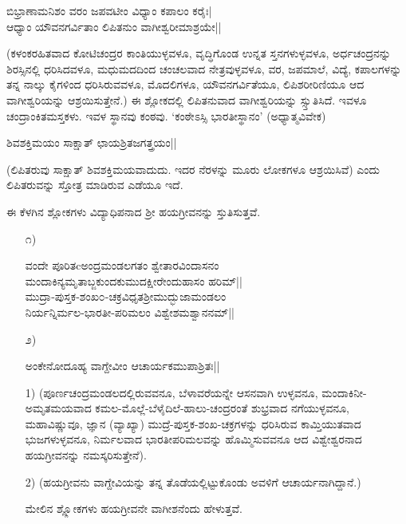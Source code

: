 \begin{shloka}
ಬಿಭ್ರಾಣಾಮನಿಶಂ ವರಂ ಜಪವಟೀಂ ವಿಧ್ಯಾಂ ಕಪಾಲಂ ಕರೈಃ|\\
ಆಧ್ಯಾಂ ಯೌವನಗರ್ವಿತಾಂ ಲಿಪಿತನುಂ ವಾಗೀಶ್ವರೀಮಾಶ್ರಯೇ||
\end{shloka}

(ಕಳಂಕರಹಿತವಾದ ಕೋಟಿಚಂದ್ರರ ಕಾಂತಿಯುಳ್ಳವಳೂ, ವೃದ್ಧಿಗೊಂಡ ಉನ್ನತ ಸ್ತನಗಳುಳ್ಳವಳೂ, ಅರ್ಧಚಂದ್ರನನ್ನು ಶಿರಸ್ಸಿನಲ್ಲಿ ಧರಿಸಿದವಳೂ, ಮಧುಮದದಿಂದ ಚಂಚಲವಾದ ನೇತ್ರವುಳ್ಳವಳೂ, ವರ, ಜಪಮಾಲೆ, ವಿದ್ಯೆ, ಕಪಾಲಗಳನ್ನು ತನ್ನ ನಾಲ್ಕು  ಕೈಗಳಿಂದ ಧರಿಸಿರುವವಳೂ, ಮೊದಲಿಗಳೂ, ಯೌವನಗರ್ವಿತೆಯೂ, ಲಿಪಿಶರೀರಿಣಿಯೂ ಆದ ವಾಗೀಶ್ವರಿಯನ್ನು ಆಶ್ರಯಿಸುತ್ತೇನೆ.) ಈ ಶ್ಲೋಕದಲ್ಲಿ ಲಿಪಿತನುವಾದ ವಾಗೀಶ್ವರಿಯನ್ನು ಸ್ಸ್ತುತಿಸಿದೆ. ಇವಳೂ ಚಂದ್ರಾಂಕಿತಮಸ್ತಕಳು. ಇವಳ ಸ್ಥಾನವು ಕಂಠವು. `ಕಂಠೇಽಸ್ಸಿ ಭಾರತೀಸ್ಥಾನಂ' (ಅಧ್ಯಾತ್ಮವಿವೇಕ)

\begin{shloka}
ಶಿವಶಕ್ತಿಮಯಂ ಸಾಕ್ಷಾತ್ ಛಾಯಶ್ರಿತಜಗತ್ತ್ರಯಂ||
\end{shloka}

(ಲಿಪಿತರುವು ಸಾಕ್ಷಾತ್ ಶಿವಶಕ್ತಿಮಯವಾದುದು. ಇದರ ನೆರಳನ್ನು ಮೂರು ಲೋಕಗಳೂ ಆಶ್ರಯಿಸಿವೆ) ಎಂದು ಲಿಪಿತರುವನ್ನು ಸ್ತೋತ್ರ  ಮಾಡಿರುವ ಎಡೆಯೂ ಇದೆ.

ಈ ಕೆಳಗಿನ ಶ್ಲೋಕಗಳು ವಿದ್ಯಾಧಿಪನಾದ ಶ್ರೀ ಹಯಗ್ರೀವನನ್ನು ಸ್ತುತಿಸುತ್ತವೆ.

\begin{itemize}
\item[೧)] 

\begin{shloka}
ವಂದೇ ಪೂರಿತcಅಂದ್ರಮಂಡಲಗತಂ ಶ್ವೇತಾರವಿಂದಾಸನಂ \\
ಮಂದಾಕಿನ್ಯಮೃತಾಬ್ಜಕುಂದಕುಮುದಕ್ಷೀರೇಂದುಹಾಸಂ ಹರಿಮ್||\\

\medskip
ಮುದ್ರಾ-ಪುಸ್ತಕ-ಶಂಖ೦-ಚಕ್ರವಿಧೃತಶ್ರೀಮುದ್ಭುಜಾಮಂಡಲಂ\\
ನಿರ್ಯನ್ನಿರ್ಮಲ-ಭಾರತೀ-ಪರಿಮಲಂ ವಿಶ್ವೇಶಮಶ್ವಾನನಮ್||
\end{shloka}

\item[೨)] 

\begin{shloka}
ಅಂಕೇನೋದೂಹ್ಯ ವಾಗ್ದೇವೀಂ ಆಚಾರ್ಯಕಮುಪಾಶ್ರಿತಃ||
\end{shloka}
\end{itemize}

\begin{itemize}
\item[1)] (ಪೂರ್ಣಚಂದ್ರಮಂಡಲದಲ್ಲಿರುವವನೂ, ಬೆಳಾವರೆಯನ್ನೇ ಆಸನವಾಗಿ ಉಳ್ಳವನೂ, ಮಂದಾಕಿನೀ-ಅಮೃತಮಯವಾದ ಕಮಲ-ಮೊಲ್ಲೆ-ಬೆಳೈದಿಲೆ-ಹಾಲು-ಚಂದ್ರರಂತೆ ಶುಭ್ರವಾದ ನಗೆಯುಳ್ಳವನೂ, ಮಹಾವಿಷ್ಣುವೂ, ಜ್ಞಾನ (ವ್ಯಾಖ್ಯಾ) ಮುದ್ರೆ-ಪುಸ್ತಕ-ಶಂಖ-ಚಕ್ರಗಳನ್ನು ಧರಿಸಿರುವ ಕಾಮ್ತಿಯುತವಾದ ಭುಜಗಳುಳ್ಳವನೂ, ನಿರ್ಮಲವಾದ ಭಾರತೀಪರಿಮಲವನ್ನು ಹೊಮ್ಮಿಸುವವನೂ ಆದ ವಿಶ್ವೇಶ್ವರನಾದ ಹಯಗ್ರೀವನನ್ನು ನಮಸ್ಕರಿಸುತ್ತೇನೆ).
 
\item[2)] (ಹಯಗ್ರೀವನು ವಾಗ್ದೇವಿಯನ್ನು ತನ್ನ ತೊಡೆಯಲ್ಲಿಟ್ಟುಕೊಂಡು ಅವಳಿಗೆ ಆಚಾರ್ಯನಾಗಿದ್ದಾನೆ.)

ಮೇಲಿನ ಶ್ಲ್ಲೋಕಗಳು ಹಯಗ್ರೀವನೇ ವಾಗೀಶನೆಂದು ಹೇಳುತ್ತವೆ.
\end{itemize}

